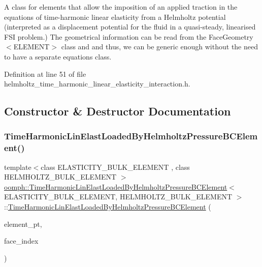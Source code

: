 A class for elements that allow the imposition of an applied traction in the equations of time-\/harmonic linear elasticity from a Helmholtz potential (interpreted as a displacement potential for the fluid in a quasi-\/steady, linearised F\+SI problem.) The geometrical information can be read from the Face\+Geometry$<$\+E\+L\+E\+M\+E\+N\+T$>$ class and and thus, we can be generic enough without the need to have a separate equations class. 

Definition at line 51 of file helmholtz\+\_\+time\+\_\+harmonic\+\_\+linear\+\_\+elasticity\+\_\+interaction.\+h.



\subsection{Constructor \& Destructor Documentation}
\mbox{\label{classoomph_1_1TimeHarmonicLinElastLoadedByHelmholtzPressureBCElement_af0ac460cd2caeb9ba7c7b27e13d5ebc6}} 
\subsubsection{\texorpdfstring{Time\+Harmonic\+Lin\+Elast\+Loaded\+By\+Helmholtz\+Pressure\+B\+C\+Element()}{TimeHarmonicLinElastLoadedByHelmholtzPressureBCElement()}}
{\footnotesize\ttfamily template$<$class E\+L\+A\+S\+T\+I\+C\+I\+T\+Y\+\_\+\+B\+U\+L\+K\+\_\+\+E\+L\+E\+M\+E\+NT , class H\+E\+L\+M\+H\+O\+L\+T\+Z\+\_\+\+B\+U\+L\+K\+\_\+\+E\+L\+E\+M\+E\+NT $>$ \\
\hyperlink{classoomph_1_1TimeHarmonicLinElastLoadedByHelmholtzPressureBCElement}{oomph\+::\+Time\+Harmonic\+Lin\+Elast\+Loaded\+By\+Helmholtz\+Pressure\+B\+C\+Element}$<$ E\+L\+A\+S\+T\+I\+C\+I\+T\+Y\+\_\+\+B\+U\+L\+K\+\_\+\+E\+L\+E\+M\+E\+NT, H\+E\+L\+M\+H\+O\+L\+T\+Z\+\_\+\+B\+U\+L\+K\+\_\+\+E\+L\+E\+M\+E\+NT $>$\+::\hyperlink{classoomph_1_1TimeHarmonicLinElastLoadedByHelmholtzPressureBCElement}{Time\+Harmonic\+Lin\+Elast\+Loaded\+By\+Helmholtz\+Pressure\+B\+C\+Element} (\begin{DoxyParamCaption}\item[{Finite\+Element $\ast$const \&}]{element\+\_\+pt,  }\item[{const int \&}]{face\+\_\+index }\end{DoxyParamCaption})\hspace{0.3cm}{\ttfamily [inline]}}



